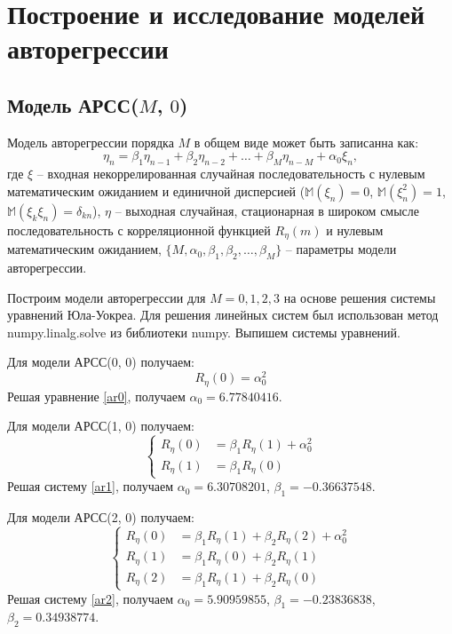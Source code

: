 \documentclass[12pt, fleqn]{article}
\begin{document}
\section{Построение и исследование моделей авторегрессии}
{
	\subsection{Модель АРСС($M$, $0$)}
	{
		Модель авторегрессии порядка $M$ в общем виде может быть записанна как:
		\begin{equation}
			\eta_n = \beta_1\eta_{n-1} + \beta_2 \eta_{n-2} + \dots + \beta_M \eta_{n-M} +\alpha_0 \xi_n,
		\end{equation}
		где $\xi$ -- входная некоррелированная случайная последовательность с нулевым математическим ожиданием и единичной дисперсией ($\mathbb{M}(\xi_n)=0$, $\mathbb{M}(\xi^2_n)=1$, $\mathbb{M}(\xi_k \xi_n)=\delta_{kn}$), $\eta$ -- выходная случайная, стационарная в широком смысле последовательность с корреляционной функцией $R_{\eta}(m)$ и нулевым математическим ожиданием, $\{M, \alpha_0, \beta_1, \beta_2, \dots, \beta_M\}$ -- параметры модели авторегрессии.\medskip 
										      
		Построим модели авторегрессии для $M = 0,1,2,3$ на основе решения системы уравнений Юла-Уокреа. Для решения линейных систем был использован метод numpy.linalg.solve из библиотеки numpy. Выпишем системы уравнений.\medskip 
										      
		Для модели АРСС(0, 0) получаем:
		\begin{equation}\label{ar0}
			R_{\eta}(0) = \alpha^2_0
		\end{equation}
		Решая уравнение \eqref{ar0}, получаем $\alpha_0 = 6.77840416$.\medskip 
										      
		Для модели АРСС(1, 0) получаем:
		\begin{equation}\label{ar1}
			\left\{
			\begin{split}
				R_{\eta}(0) &= \beta_1 R_{\eta}(1) + \alpha^2_0 \\
				R_{\eta}(1) &= \beta_1 R_{\eta}(0)
			\end{split}
			\right.
		\end{equation}
		Решая систему \eqref{ar1}, получаем $\alpha_0 = 6.30708201$, $\beta_1 = -0.36637548$.\medskip 
										      
		Для модели АРСС(2, 0) получаем:
		\begin{equation}\label{ar2}
			\left\{
			\begin{split}
				R_{\eta}(0) &= \beta_1 R_{\eta}(1) + \beta_2 R_{\eta}(2) + \alpha^2_0 \\
				R_{\eta}(1) &= \beta_1 R_{\eta}(0) + \beta_2 R_{\eta}(1) \\
				R_{\eta}(2) &= \beta_1 R_{\eta}(1) + \beta_2 R_{\eta}(0)
			\end{split}
			\right.
		\end{equation}
		Решая систему \eqref{ar2}, получаем $\alpha_0 = 5.90959855$, $\beta_1 = -0.23836838$, $\beta_2 = 0.34938774$.\medskip 
										      
}}
\end{document}

